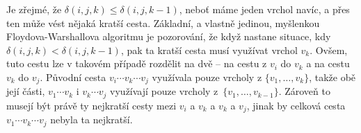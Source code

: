 Je zřejmé, že $\delta(i,j,k) \leq \delta(i,j,k-1)$, neboť máme jeden vrchol
navíc, a přes ten může vést nějaká kratší cesta. Základní, a vlastně jedinou,
myšlenkou Floydova-Warshallova algoritmu je pozorování, že když nastane situace,
kdy ${\delta(i,j,k) < \delta(i,j,k-1)}$, pak ta kratší cesta musí využívat
vrchol $v_k$. Ovšem, tuto cestu lze v takovém případě rozdělit na dvě -- na
cestu z $v_i$ do $v_k$ a na cestu $v_k$ do $v_j$. Původní cesta $v_i\cdots v_k
\cdots v_j$ využívala pouze vrcholy z $\{v_1,\ldots,v_k\}$, takže obě její
části, $v_1 \cdots v_k$ i $v_k \cdots v_j$ využívají pouze vrcholy
z~$\{v_1,\ldots,v_{k-1}\}$. Zároveň to musejí být právě ty nejkratší cesty mezi
$v_i$ a $v_k$ a $v_k$ a $v_j$, jinak by celková cesta $v_1 \cdots v_k \cdots
v_j$ nebyla ta nejkratší.
